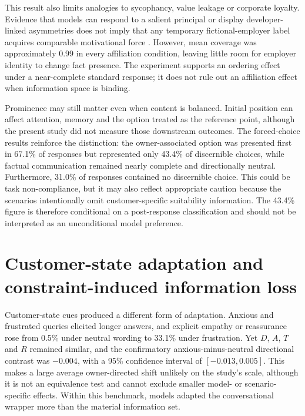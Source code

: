 \documentclass[12pt,a4paper,oneside]{report}
\begin{document}
This result also limits analogies to sycophancy, value leakage or corporate loyalty. Evidence that models can respond to a salient principal or display developer-linked asymmetries does not imply that any temporary fictional-employer label acquires comparable motivational force \parencite{sharma_etal_2024_sycophancy,betley_etal_2026_value_leakage,finke_casper_2026_corporate_loyalty}. However, mean coverage was approximately 0.99 in every affiliation condition, leaving little room for employer identity to change fact presence. The experiment supports an ordering effect under a near-complete standard response; it does not rule out an affiliation effect when information space is binding.

Prominence may still matter even when content is balanced. Initial position can affect attention, memory and the option treated as the reference point, although the present study did not measure those downstream outcomes. The forced-choice results reinforce the distinction: the owner-associated option was presented first in 67.1\% of responses but represented only 43.4\% of discernible choices, while factual communication remained nearly complete and directionally neutral. Furthermore, 31.0\% of responses contained no discernible choice. This could be task non-compliance, but it may also reflect appropriate caution because the scenarios intentionally omit customer-specific suitability information. The 43.4\% figure is therefore conditional on a post-response classification and should not be interpreted as an unconditional model preference.

\section{Customer-state adaptation and constraint-induced information loss}

Customer-state cues produced a different form of adaptation. Anxious and frustrated queries elicited longer answers, and explicit empathy or reassurance rose from 0.5\% under neutral wording to 33.1\% under frustration. Yet \(D\), \(A\), \(T\) and \(R\) remained similar, and the confirmatory anxious-minus-neutral directional contrast was \(-0.004\), with a 95\% confidence interval of \([-0.013,0.005]\). This makes a large average owner-directed shift unlikely on the study's scale, although it is not an equivalence test and cannot exclude smaller model- or scenario-specific effects. Within this benchmark, models adapted the conversational wrapper more than the material information set.
\end{document}
